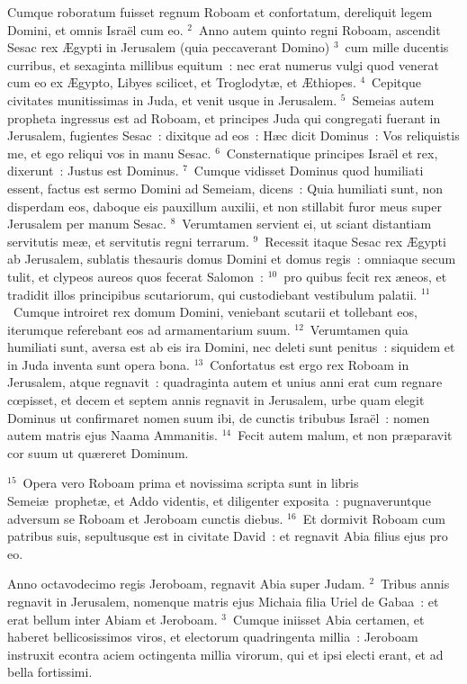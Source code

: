 \bchapter
\lettrine[lines=3,image=true,loversize=0.05,lraise=-0.03]{C}{}umque roboratum fuisset regnum Roboam et confortatum, dereliquit legem Domini, et omnis Isra\"el cum eo.
${}^{2}$~Anno autem quinto regni Roboam, ascendit Sesac rex \AE gypti in Jerusalem (quia peccaverant Domino)
${}^{3}$~cum mille ducentis curribus, et sexaginta millibus equitum~: nec erat numerus vulgi quod venerat cum eo ex \AE gypto, Libyes scilicet, et Troglodyt\ae , et \AE thiopes.
${}^{4}$~Cepitque civitates munitissimas in Juda, et venit usque in Jerusalem.
${}^{5}$~Semeias autem propheta ingressus est ad Roboam, et principes Juda qui congregati fuerant in Jerusalem, fugientes Sesac~: dixitque ad eos~: H\ae c dicit Dominus~: Vos reliquistis me, et ego reliqui vos in manu Sesac.
${}^{6}$~Consternatique principes Isra\"el et rex, dixerunt~: Justus est Dominus.
${}^{7}$~Cumque vidisset Dominus quod humiliati essent, factus est sermo Domini ad Semeiam, dicens~: Quia humiliati sunt, non disperdam eos, daboque eis pauxillum auxilii, et non stillabit furor meus super Jerusalem per manum Sesac.
${}^{8}$~Verumtamen servient ei, ut sciant distantiam servitutis me\ae , et servitutis regni terrarum.
${}^{9}$~Recessit itaque Sesac rex \AE gypti ab Jerusalem, sublatis thesauris domus Domini et domus regis~: omniaque secum tulit, et clypeos aureos quos fecerat Salomon~:
${}^{10}$~pro quibus fecit rex \ae neos, et tradidit illos principibus scutariorum, qui custodiebant vestibulum palatii.
${}^{11}$~Cumque introiret rex domum Domini, veniebant scutarii et tollebant eos, iterumque referebant eos ad armamentarium suum.
${}^{12}$~Verumtamen quia humiliati sunt, aversa est ab eis ira Domini, nec deleti sunt penitus~: siquidem et in Juda inventa sunt opera bona.
${}^{13}$~Confortatus est ergo rex Roboam in Jerusalem, atque regnavit~: quadraginta autem et unius anni erat cum regnare cœpisset, et decem et septem annis regnavit in Jerusalem, urbe quam elegit Dominus ut confirmaret nomen suum ibi, de cunctis tribubus Isra\"el~: nomen autem matris ejus Naama Ammanitis.
${}^{14}$~Fecit autem malum, et non pr\ae paravit cor suum ut qu\ae reret Dominum.


${}^{15}$~Opera vero Roboam prima et novissima scripta sunt in libris Semei\ae\ prophet\ae , et Addo videntis, et diligenter exposita~: pugnaveruntque adversum se Roboam et Jeroboam cunctis diebus.
${}^{16}$~Et dormivit Roboam cum patribus suis, sepultusque est in civitate David~: et regnavit Abia filius ejus pro eo.

\bchapter
\lettrine[lines=3,image=true,loversize=0.05,lraise=-0.03]{A}{}nno octavodecimo regis Jeroboam, regnavit Abia super Judam.
${}^{2}$~Tribus annis regnavit in Jerusalem, nomenque matris ejus Michaia filia Uriel de Gabaa~: et erat bellum inter Abiam et Jeroboam.
${}^{3}$~Cumque iniisset Abia certamen, et haberet bellicosissimos viros, et electorum quadringenta millia~: Jeroboam instruxit econtra aciem octingenta millia virorum, qui et ipsi electi erant, et ad bella fortissimi.


